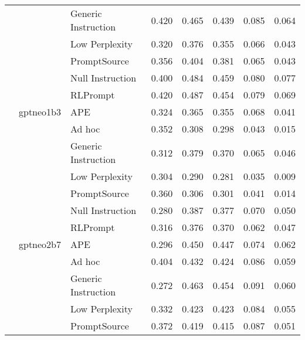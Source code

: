 \begin{supertabular}{lllrrrrr}
              &        & Generic Instruction &            0.420 &           0.465 &          0.439 &        0.085 &    0.064 \\
              &        & Low Perplexity &            0.320 &           0.376 &          0.355 &        0.066 &    0.043 \\
              &        & PromptSource &            0.356 &           0.404 &          0.381 &        0.065 &    0.043 \\
              &        & Null Instruction &            0.400 &           0.484 &          0.459 &        0.080 &    0.077 \\
              &        & RLPrompt &            0.420 &           0.487 &          0.454 &        0.079 &    0.069 \\
              & gptneo1b3 & APE &            0.324 &           0.365 &          0.355 &        0.068 &    0.041 \\
              &        & Ad hoc &            0.352 &           0.308 &          0.298 &        0.043 &    0.015 \\
              &        & Generic Instruction &            0.312 &           0.379 &          0.370 &        0.065 &    0.046 \\
              &        & Low Perplexity &            0.304 &           0.290 &          0.281 &        0.035 &    0.009 \\
              &        & PromptSource &            0.360 &           0.306 &          0.301 &        0.041 &    0.014 \\
              &        & Null Instruction &            0.280 &           0.387 &          0.377 &        0.070 &    0.050 \\
              &        & RLPrompt &            0.316 &           0.376 &          0.370 &        0.062 &    0.047 \\
              & gptneo2b7 & APE &            0.296 &           0.450 &          0.447 &        0.074 &    0.062 \\
              &        & Ad hoc &            0.404 &           0.432 &          0.424 &        0.086 &    0.059 \\
              &        & Generic Instruction &            0.272 &           0.463 &          0.454 &        0.091 &    0.060 \\
              &        & Low Perplexity &            0.332 &           0.423 &          0.423 &        0.084 &    0.055 \\
              &        & PromptSource &            0.372 &           0.419 &          0.415 &        0.087 &    0.051 \\

\end{supertabular}
